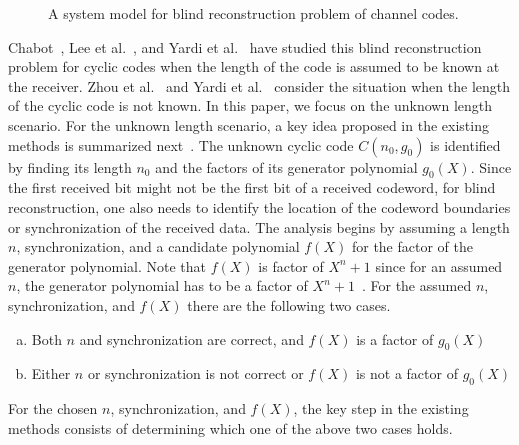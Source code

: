 \documentclass[10pt,journal]{IEEEtran}
\begin{document}
\begin{figure}[t]
\begin{center}
\end{center}

\caption{A system model for blind reconstruction problem of channel codes.}
% 
\label{Figure_blind_reconstruction_problem_intro}
\end{figure}
% 

Chabot~\cite{Chabot_thesis}, Lee et al.~\cite{LeeSong2012_Korea}, and Yardi et al.~\cite{EuropeanWireless2014}
have studied this blind reconstruction problem for cyclic codes when the length of the code is assumed to be known at the receiver.
% 
Zhou et al.~\cite{Zhou2013_Entropy_new, Zhou2013_Entropy} and Yardi et al.~\cite{TCOMM_2016} consider the situation
when the length of the cyclic code is not known.
% 
In this paper, we focus on the unknown length scenario.
% 
For the unknown length scenario, a key idea proposed in the existing methods is summarized next~\cite{TCOMM_2016, Zhou2013_Entropy_new, Zhou2013_Entropy}.
The unknown cyclic code $C(n_0,g_0)$ is identified by finding its length $n_0$ and the factors of its generator polynomial $g_0(X)$.
Since the first received bit might not be the first bit of a received codeword, for blind reconstruction, 
one also needs to identify the location of the codeword boundaries or synchronization of the received data.
% 
The analysis begins by assuming a length $n$,
synchronization, and a candidate polynomial $f(X)$ for the factor of the generator polynomial.
Note that $f(X)$ is factor of $X^n+1$ since for an assumed $n$, the generator polynomial has to be a factor of $X^n+1$~\cite{LinCostello2004}.
For the assumed $n$, synchronization, and $f(X)$ there are the following two cases.
% 
\begin{enumerate}[(a)]
%  
\item Both $n$ and synchronization are correct, and $f(X)$ is a factor of $g_0(X)$
% 
\item Either $n$ or synchronization is not correct or $f(X)$ is not a factor of $g_0(X)$
% 
\end{enumerate}
% 
For the chosen $n$, synchronization, and $f(X)$, the key step in the existing methods
consists of determining which one of the above two cases holds.
\end{document}
